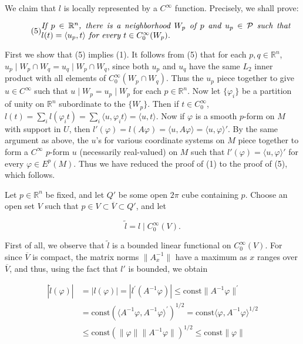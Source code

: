 We claim that $l$ is locally represented by a $C^{\infty}$ function. Precisely, we shall prove:

\begin{equation}
\tag{5}\label{eq:6.32:5}
\parbox{.88\linewidth}{\itshape If $p\in\mathbb R^n$, there is a neighborhood
$W_p$ of $p$ and $u_p\in\mathcal P$ such that $l(t)=\langle u_p,t\rangle$
for every $t\in C_0^\infty(W_p)$.}
\end{equation}

First we show that (5) implies (1). It follows from (5) that for each $p, q \in \mathbb{R}^n$, $u_p \mid W_p \cap W_q = u_q \mid W_p \cap W_q$, since both $u_p$ and $u_q$ have the same $L_2$ inner product with all elements of $C_0^\infty(W_p \cap W_q)$. Thus the $u_p$ piece together to give $u \in C^\infty$ such that $u \mid W_p = u_p \mid W_p$ for each $p \in \mathbb{R}^n$. Now let $\{\varphi_i\}$ be a partition of unity on $\mathbb{R}^n$ subordinate to the $\{W_p\}$. Then if $t \in C_0^\infty$, $l(t) = \sum_i l(\varphi_i t) = \sum_i \langle u, \varphi_i t \rangle = \langle u, t \rangle$. Now if $\varphi$ is a smooth $p$-form on $M$ with support in $U$, then $l'(\varphi) = l(A\varphi) = \langle u, A\varphi \rangle = \langle u, \varphi \rangle'$. By the same argument as above, the $u$'s for various coordinate systems on $M$ piece together to form a $C^\infty$ $p$-form $u$ (necessarily real-valued) on $M$ such that $l'(\varphi) = \langle u, \varphi \rangle'$ for every $\varphi \in E^p(M)$. Thus we have reduced the proof of (1) to the proof of (5), which follows.

Let $p \in \mathbb{R}^n$ be fixed, and let $Q'$ be some open $2\pi$ cube containing $p$. Choose an open set $V$ such that $p \in V \subset \overline{V} \subset Q'$, and let

\begin{equation}
\tag{6}\label{eq:6.32:6}
\tilde{l}=l\mid C_{0}^{\infty}(V).
\end{equation}

First of all, we observe that $\tilde{l}$ is a bounded linear functional on  $ C_0^\infty(V) $. For since  $ \overline{V} $ is compact, the matrix norms $\|A_x^{-1}\|$ have a maximum as $x$ ranges over $\overline{V}$, and thus, using the fact that $l'$ is bounded, we obtain

\[
\begin{aligned}{|\tilde{l}(\varphi)|}&{{}=|l(\varphi)|=|l^{\prime}(A^{-1}\varphi)|\leq\mathrm{const}\|A^{-1}\varphi\|^{\prime}}\\ {}&{{}=\mathrm{const}\left(\langle A^{-1}\varphi,A^{-1}\varphi\rangle^{\prime}\right)^{1/2}=\mathrm{const}\langle\varphi,A^{-1}\varphi\rangle^{1/2}}\\ {}&{{}\leq\mathrm{const}\left(\|\varphi\|\|A^{-1}\varphi\|\right)^{1/2}\leq\mathrm{const}\|\varphi\|}\\ \end{aligned}
\]

